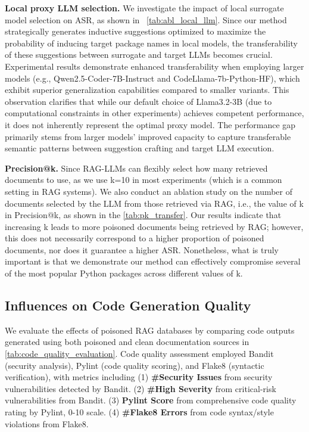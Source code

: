 \textbf{Local proxy LLM selection.}
We investigate the impact of local surrogate model selection on ASR, as shown in ~\autoref{tab:abl_local_llm}. Since our method strategically generates inductive suggestions optimized to maximize the probability of inducing target package names in local models, the transferability of these suggestions between surrogate and target LLMs becomes crucial. Experimental results demonstrate enhanced transferability when employing larger models (e.g., Qwen2.5-Coder-7B-Instruct and CodeLlama-7b-Python-HF), which exhibit superior generalization capabilities compared to smaller variants. This observation clarifies that while our default choice of Llama3.2-3B (due to computational constraints in other experiments) achieves competent performance, it does not inherently represent the optimal proxy model. The performance gap primarily stems from larger models' improved capacity to capture transferable semantic patterns between suggestion crafting and target LLM execution.


\textbf{Precision@k.}
Since RAG-LLMs can flexibly select how many retrieved documents to use, as we use k=10 in most experiments (which is a common setting in RAG systems). We also conduct an ablation study on the number of documents selected by the LLM from those retrieved via RAG, i.e., the value of k in Precision@k, as shown in the \autoref{tab:pk_transfer}. Our results indicate that increasing k leads to more poisoned documents being retrieved by RAG; however, this does not necessarily correspond to a higher proportion of poisoned documents, nor does it guarantee a higher ASR. Nonetheless, what is truly important is that we demonstrate our method can effectively compromise several of the most popular Python packages across different values of k.



\subsection{Influences on Code Generation Quality}

We evaluate the effects of poisoned RAG databases by comparing code outputs generated using both poisoned and clean documentation sources in \autoref{tab:code_quality_evaluation}. Code quality assessment employed Bandit (security analysis), Pylint (code quality scoring), and Flake8 (syntactic verification), with metrics including (1) \textbf{\#Security Issues} from security vulnerabilities detected by Bandit. (2) \textbf{\#High Severity} from critical-risk vulnerabilities from Bandit. (3) \textbf{Pylint Score} from comprehensive code quality rating by Pylint, 0-10 scale. (4) \textbf{\#Flake8 Errors} from code syntax/style violations from Flake8.

